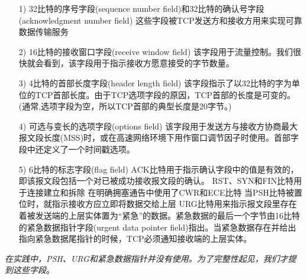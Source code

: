 \begin{itemize}
    \item [1)] 32比特的序号字段(sequence number field)和32比特的确认号字段(acknowledgment number field)
    \subitem 这些字段被TCP发送方和接收方用来实现可靠数据传输服务
    \item [2)] 16比特的接收窗口字段(receive window field)
    \subitem 该字段用于流量控制。我们很快就会看到，该字段用于指示接收方愿意接受的字节数量。
    \item [3)] 4比特的首部长度字段(header length field)
    \subitem 该字段指示了以32比特的字为单位的TCP首部长度。由于TCP选项字段的原因，TCP首部的长度是可变的。(通常,选项字段为空，所以TCP首部的典型长度是20字节。)
    \item [4)] 可选与变长的选项字段(options field)
    \subitem 该字段用于发送方与接收方协商最大报文段长度(MSS)时，或在高速网络环境下用作窗口调节因子时使用。首部字段中还定义了一个时间戳选项。
    \item [5)] 6比特的标志字段(flag field)
    \subitem [a] ACK比特用于指示确认字段中的值是有效的，即该报文段包括一个对已被成功接收报文段的确认。
    \subitem [b] RST、SYN和FIN比特用于连接建立和拆除
    \subitem [c] 在明确拥塞通告中使用了CWR和ECE比特
    \subitem [d] 当PSH比特被置位时，就指示接收方应立即将数据交给上层
    \subitem [e] URG比特用来指示报文段里存在着被发送端的上层实体置为“紧急”的数据。紧急数据的最后一个字节由16比特的紧急数据指针字段(urgent data pointer field)指出。当紧急数据存在并给出指向紧急数据尾指针的时候，TCP必须通知接收端的上层实体。
\end{itemize}

    \emph{在实践中，PSH、URG和紧急数据指针并没有使用。为了完整性起见，我们才提到这些字段}。

    